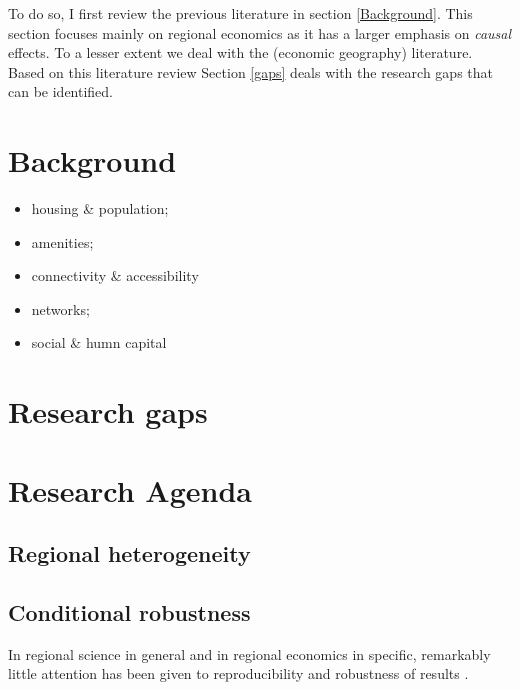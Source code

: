 \documentclass[fleqn,10pt]{SelfArx} %
\begin{document}
To do so, I first review the previous literature in section \ref{Background}. This section focuses mainly on regional economics as it has a larger emphasis on \textit{causal} effects. To a lesser extent we deal with the (economic geography) literature. Based on this literature review Section \ref{gaps} deals with the research gaps that can be identified.


\section{Background\label{Background}}


\begin{itemize}
	\item housing \& population; 
	\item amenities;
	\item connectivity \& accessibility
	\item networks;
	\item social \& humn capital
\end{itemize}


\section{Research gaps\label{gaps}}


\section{Research Agenda}


\subsection{Regional heterogeneity}

\citep{Thissen2016, Graaff2012, DeGraaff2012}

\subsection{Conditional robustness}

In regional science in general and in regional economics in specific, remarkably little attention has been given to reproducibility and robustness of results \citep[with some exceptions as, amongst some others, by][]{Rey:2014cl,arribas2015woow, Arribas2016}.
\end{document}
